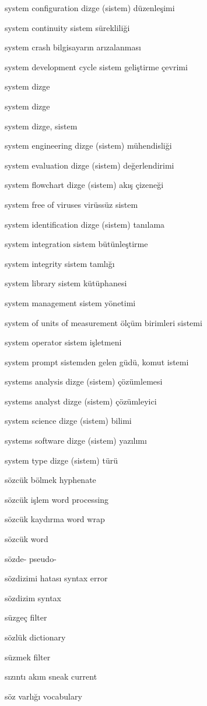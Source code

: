 \documentclass[12pt,fleqn]{article}\usepackage{../../common}
\begin{document}
system configuration dizge (sistem) düzenleşimi

system continuity sistem sürekliliği

system crash bilgisayarın arızalanması

system development cycle sistem geliştirme çevrimi

system dizge

system dizge

system dizge, sistem

system engineering dizge (sistem) mühendisliği

system evaluation dizge (sistem) değerlendirimi

system flowchart dizge (sistem) akış çizeneği

system free of viruses virüssüz sistem

system identification dizge (sistem) tanılama

system integration sistem bütünleştirme

system integrity sistem tamlığı

system library sistem kütüphanesi

system management sistem yönetimi

system of units of measurement ölçüm birimleri sistemi

system operator sistem işletmeni

system prompt sistemden gelen güdü, komut istemi

systems analysis dizge (sistem) çözümlemesi

systems analyst dizge (sistem) çözümleyici

system science dizge (sistem) bilimi

systems software dizge (sistem) yazılımı

system type dizge (sistem) türü

sözcük bölmek hyphenate

sözcük işlem word processing

sözcük kaydırma word wrap

sözcük word

sözde- pseudo-

sözdizimi hatası syntax error

sözdizim syntax

süzgeç filter

sözlük dictionary

süzmek filter

sızıntı akım sneak current

söz varlığı vocabulary
\end{document}
